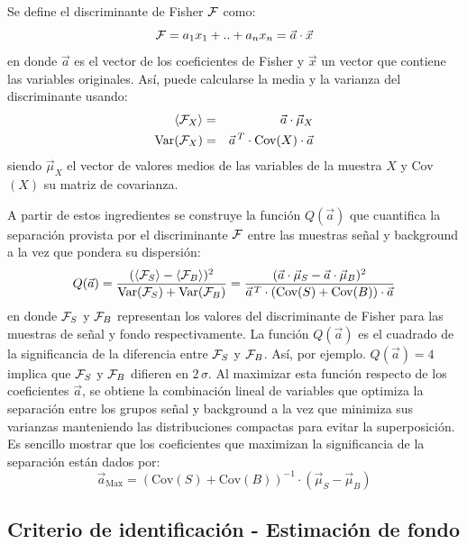 	Se define el discriminante de Fisher ${\cal F}$ como:
	\begin{equation}
	{\cal F} = a_1 x_1 + .. + a_n x_n = \vec{a}\cdot \vec{x}
	\end{equation}
	en donde $\vec{a}$ es el vector de los coeficientes de Fisher y $\vec{x}$ un vector que contiene las variables originales.
	Así, puede calcularse la media y la varianza del discriminante usando:
	\begin{eqnarray}
	\langle{\cal F}_X\rangle &=& \vec{a}\cdot\vec{\mu}_X \\
	\text{Var}({\cal F}_X)   &=& \vec{a}^{\,T} \cdot \text{Cov}(X) \cdot\vec{a}
	\end{eqnarray}
	siendo $\vec{\mu}_X$ el vector de valores medios de las variables de la muestra $X$ y Cov$(X)$ su matriz de covarianza.

	A partir de estos ingredientes se construye la función $Q(\vec{a})$ que cuantifica la separación provista por el discriminante $\cal{F}$
	entre las muestras señal y background a la vez que pondera su dispersión:
	\begin{equation}
	Q(\vec{a}) = \frac{( \langle{\cal F}_S\rangle - \langle{\cal F}_B \rangle)^2}{\text{Var}({\cal F}_S)+\text{Var}({\cal F}_B)}
	= \frac{(\vec{a}\cdot\vec{\mu}_S  - \vec{a}\cdot\vec{\mu}_B)^2}
					{\vec{a}^{\,T} \cdot (\text{Cov}(S) + \text{Cov}(B) )\cdot\vec{a}} 
	\end{equation}
	en donde ${\cal F}_S$ y ${\cal F}_B$ representan los valores del discriminante de Fisher para las muestras de señal y fondo respectivamente.
	La función $Q(\vec{a})$ es el cuadrado de la significancia de la diferencia entre ${\cal F}_S$ y ${\cal F}_B$. Así, por ejemplo. $Q(\vec{a})=4$ implica que  ${\cal F}_S$ y ${\cal F}_B$ difieren en $2\,\sigma$.
	Al maximizar esta función respecto de los coeficientes $\vec{a}$, se obtiene la combinación lineal de variables que optimiza la separación entre los grupos señal y background a la vez que minimiza sus varianzas manteniendo las distribuciones compactas para evitar la superposición. 
	Es sencillo mostrar que los coeficientes que maximizan la significancia de la separación están dados por:
	\begin{equation}
	\vec{a}_{\text{Max}} = (\text{Cov}(S) + \text{Cov}(B) )^{-1} \cdot (\vec{\mu}_S - \vec{\mu}_B)   
	\end{equation}
	
	
	\subsection{Criterio de identificación - Estimación de fondo}
	\label{sbsc:fondo}
	
